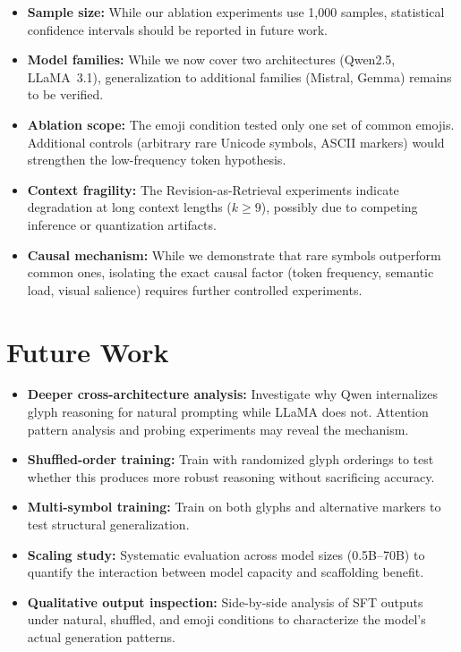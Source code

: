 \documentclass[11pt]{article}
\begin{document}
\begin{itemize}
    \item \textbf{Sample size:} While our ablation experiments use 1{,}000 samples, statistical confidence intervals should be reported in future work.
    \item \textbf{Model families:} While we now cover two architectures (Qwen2.5, LLaMA~3.1), generalization to additional families (Mistral, Gemma) remains to be verified.
    \item \textbf{Ablation scope:} The emoji condition tested only one set of common emojis. Additional controls (arbitrary rare Unicode symbols, ASCII markers) would strengthen the low-frequency token hypothesis.
    \item \textbf{Context fragility:} The Revision-as-Retrieval experiments indicate degradation at long context lengths ($k \geq 9$), possibly due to competing inference or quantization artifacts.
    \item \textbf{Causal mechanism:} While we demonstrate that rare symbols outperform common ones, isolating the exact causal factor (token frequency, semantic load, visual salience) requires further controlled experiments.
\end{itemize}

\section{Future Work}

\begin{itemize}
    \item \textbf{Deeper cross-architecture analysis:} Investigate why Qwen internalizes glyph reasoning for natural prompting while LLaMA does not. Attention pattern analysis and probing experiments may reveal the mechanism.
    \item \textbf{Shuffled-order training:} Train with randomized glyph orderings to test whether this produces more robust reasoning without sacrificing accuracy.
    \item \textbf{Multi-symbol training:} Train on both glyphs and alternative markers to test structural generalization.
    \item \textbf{Scaling study:} Systematic evaluation across model sizes (0.5B--70B) to quantify the interaction between model capacity and scaffolding benefit.
    \item \textbf{Qualitative output inspection:} Side-by-side analysis of SFT outputs under natural, shuffled, and emoji conditions to characterize the model's actual generation patterns.
\end{itemize}
\end{document}
